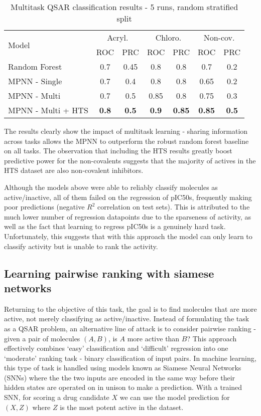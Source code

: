 \begin{table}[!h]
\caption{Multitask QSAR classification results - 5 runs, random stratified split}
\centering
\label{table:multitask_table}
\begin{tabular}{lcccccc}
\toprule
\multirow{2}{*}{Model} & \multicolumn{2}{c}{Acryl.} & \multicolumn{2}{c}{Chloro.} & \multicolumn{2}{c}{Non-cov.}\\ 
\cmidrule(lr){2-3} \cmidrule(lr){4-5} \cmidrule(lr){6-7}
  & ROC & PRC  & ROC & PRC & ROC & PRC \\ 
\midrule
Random Forest & 0.7 & 0.45 & 0.8 & 0.8 & 0.7 & 0.2 \\

MPNN - Single & 0.7 & 0.4 & 0.8 & 0.8 & 0.65 & 0.2 \\

MPNN - Multi & 0.7 & 0.5 & 0.85 & 0.8 & 0.75 & 0.3 \\

MPNN - Multi + HTS & \textbf{0.8} & \textbf{0.5} & \textbf{0.9} & \textbf{0.85} & \textbf{0.85} & \textbf{0.5} \\
\bottomrule
\end{tabular}
\end{table}

The results clearly show the impact of multitask learning - sharing information across tasks allows the MPNN to outperform the robust random forest baseline on all tasks. The observation that including the HTS results greatly boost predictive power for the non-covalents suggests that the majority of actives in the HTS dataset are also non-covalent inhibitors.

Although the models above were able to reliably classify molecules as active/inactive, all of them failed on the regression of pIC50s, frequently making poor predictions (negative $R^{2}$ correlation on test sets). This is attributed to the much lower number of regression datapoints due to the sparseness of activity, as well as the fact that learning to regress pIC50s is a genuinely hard task. Unfortunately, this suggests that with this approach the model can only learn to classify activity but is unable to rank the activity.

\subsection{Learning pairwise ranking with siamese networks}
Returning to the objective of this task, the goal is to find molecules that are more active, not merely classifying as active/inactive. Instead of formulating the task as a QSAR problem, an alternative line of attack is to consider pairwise ranking - given a pair of molecules $(A,B)$, is $A$ more active than $B$? This approach effectively combines `easy' classification and `difficult' regression into one `moderate' ranking task - binary classification of input pairs. In machine learning, this type of task is handled using models known as Siamese Neural Networks (SNNs) \cite{Koch2015SiamneseNN} where the the two inputs are encoded in the same way before their hidden states are operated on in unison to make a prediction. With a trained SNN, for scoring a drug candidate $X$ we can use the model prediction for $(X,Z)$ where $Z$ is the most potent active in the dataset.

